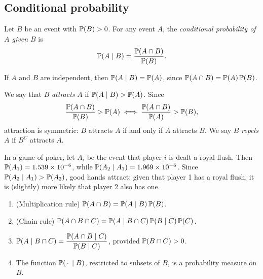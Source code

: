 \documentclass[a4paper]{article}
\begin{document}
\subsection{Conditional probability}

\begin{defi}
  Let $B$ be an event with $\P(B) > 0$. For any event $A$, the \emph{conditional probability of $A$ given $B$} is
  \[
    \P(A\mid B) = \frac{\P(A\cap B)}{\P(B)}.
  \]
\end{defi}

\begin{remark}
  If $A$ and $B$ are independent, then $\P(A\mid B) = \P(A)$, since $\P(A \cap B) = \P(A)\,\P(B)$.
\end{remark}

\begin{defi}
  We say that $B$ \emph{attracts} $A$ if $\P(A\mid B) > \P(A)$. Since
  \[
    \frac{\P(A\cap B)}{\P(B)} > \P(A) \iff \frac{\P(A\cap B)}{\P(A)} > \P(B),
  \]
  attraction is symmetric: $B$ attracts $A$ if and only if $A$ attracts $B$. We say $B$ \emph{repels} $A$ if $B^C$ attracts $A$.
\end{defi}

\begin{eg}
  In a game of poker, let $A_i$ be the event that player $i$ is dealt a royal flush. Then $\P(A_1) = 1.539\times 10^{-6}$, while $\P(A_2\mid A_1) = 1.969\times 10^{-6}$. Since $\P(A_2 \mid A_1) > \P(A_2)$, good hands attract: given that player 1 has a royal flush, it is (slightly) more likely that player 2 also has one.
\end{eg}

\begin{prop}\leavevmode
  \begin{enumerate}
    \item (Multiplication rule) $\P(A\cap B) = \P(A\mid B)\,\P(B)$.
    \item (Chain rule) $\P(A\cap B\cap C) = \P(A\mid B\cap C)\, \P(B\mid C)\, \P(C)$.
    \item $\P(A\mid B\cap C) = \dfrac{\P(A\cap B\mid C)}{\P(B\mid C)}$, provided $\P(B \cap C) > 0$.
    \item The function $\P(\ph \mid B)$, restricted to subsets of $B$, is a probability measure on $B$.
  \end{enumerate}
\end{prop}
\end{document}
